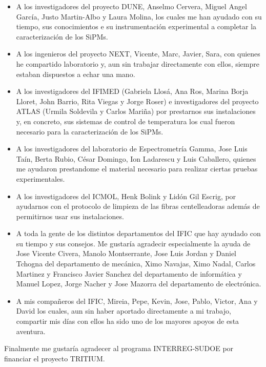 \begin{itemize}

\item{} A los investigadores del proyecto DUNE, Anselmo Cervera, Miguel Angel García, Justo Martin-Albo y Laura Molina, los cuales me han ayudado con su tiempo, sus conocimientos e su instrumentación experimental a completar la caracterización de los SiPMs. 

\item{} A los ingenieros del proyecto NEXT, Vicente, Marc, Javier, Sara, con quienes he compartido laboratorio y, aun sin trabajar directamente con ellos, siempre estaban dispuestos a echar una mano. 

\item{} A los investigadores del IFIMED (Gabriela Llosá, Ana Ros, Marina Borja Lloret, John Barrio, Rita Viegas y Jorge Roser) e investigadores del proyecto ATLAS (Urmila Soldevila y Carlos Mariña) por prestarnos sus instalaciones y, en concreto, sus sistemas de control de temperatura los cual fueron necesario para la caracterización de los SiPMs. 

\item{} A los investigadores del laboratorio de Espectrometría Gamma, Jose Luis Taín, Berta Rubio, César Domingo, Ion Ladarescu y Luis Caballero, quienes me ayudaron prestandome el material necesario para realizar ciertas pruebas experimentales.

\item{} A los investigadores del ICMOL, Henk Bolink y Lidón Gil Escrig, por ayudarnos con el protocolo de limpieza de las fibras centelleadoras además de permitirnos usar sus instalaciones.

\item{} A toda la gente de los distintos departamentos del IFIC que hay ayudado con su tiempo y sus consejos. Me gustaría agradecir especialmente la ayuda de Jose Vicente Civera, Manolo Montserrante, Jose Luis Jordan y Daniel Tchogna del departamento de mecánica, Ximo Navajas, Ximo Nadal, Carlos Martinez y Francisco Javier Sanchez del departamento de informática y Manuel Lopez, Jorge Nacher y Jose Mazorra del departamento de electrónica.

\item{} A mis compañeros del IFIC, Mireia, Pepe, Kevin, Jose, Pablo, Victor, Ana y David los cuales, aun sin haber aportado directamente a mi trabajo, compartir mis días con ellos ha sido uno de los mayores apoyos de esta aventura.

\end{itemize} 

Finalmente me gustaría agradecer al programa INTERREG-SUDOE por financiar el proyecto TRITIUM.